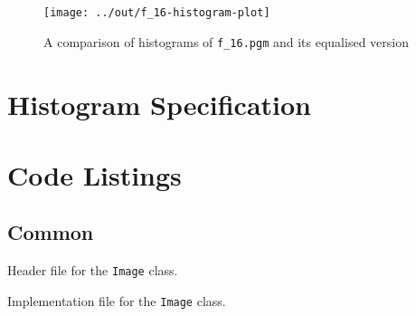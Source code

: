 \documentclass{scrartcl}
\newenvironment{longlisting}{\captionsetup{type=listing}}{}
\begin{document}
\begin{figure}[H]
	\centering\texttt{[image: ../out/f\_16-histogram-plot]}
	\caption{A comparison of histograms of \texttt{f\_16.pgm} and its equalised version}
\end{figure}

\section{Histogram Specification}

\clearpage
\section*{Code Listings}

\subsection*{Common}

\begin{longlisting}
	\caption{Header file for the \texttt{Image} class.}
\end{longlisting}

\begin{longlisting}
	\caption{Implementation file for the \texttt{Image} class.}
\end{longlisting}
\end{document}
